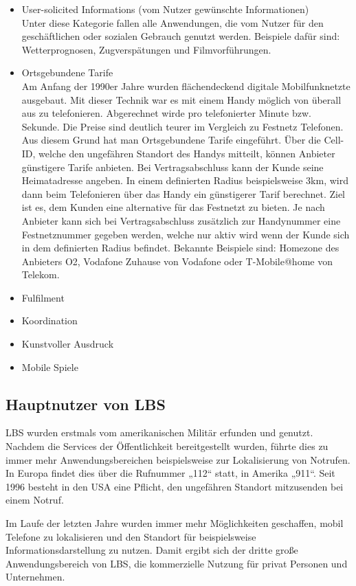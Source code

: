 \begin{itemize}
	\item User-solicited Informations (vom Nutzer gewünschte Informationen)\\
Unter diese Kategorie fallen alle Anwendungen, die vom Nutzer für den geschäftlichen oder sozialen Gebrauch genutzt werden. Beispiele dafür sind: Wetterprognosen, Zugverspätungen und Filmvorführungen.
	\item Ortsgebundene Tarife\\
	Am Anfang der 1990er Jahre wurden flächendeckend digitale Mobilfunknetzte ausgebaut. Mit dieser Technik war es mit einem Handy möglich von überall aus zu telefonieren. Abgerechnet wirde pro telefonierter Minute bzw. Sekunde. Die Preise sind deutlich teurer im Vergleich zu Festnetz Telefonen. Aus diesem Grund hat man Ortsgebundene Tarife eingeführt. Über die Cell-ID, welche den ungefähren Standort des Handys mitteilt, können Anbieter günstigere Tarife anbieten. Bei Vertragsabschluss kann der Kunde seine Heimatadresse angeben. In einem definierten Radius beispielsweise 3km, wird dann beim Telefonieren über das Handy ein günstigerer Tarif berechnet. Ziel ist es, dem Kunden eine alternative für das Festnetzt zu bieten. Je nach Anbieter kann sich bei Vertragsabschluss zusätzlich zur Handynummer eine Festnetznummer gegeben werden, welche nur aktiv wird wenn der Kunde sich in dem definierten Radius befindet. Bekannte Beispiele sind: Homezone des Anbieters O2, Vodafone Zuhause von Vodafone oder T-Mobile@home von Telekom.
	\item Fulfilment
	\item Koordination
	\item Kunstvoller Ausdruck
	\item Mobile Spiele
\end{itemize}


\subsection{Hauptnutzer von LBS}

LBS wurden erstmals vom amerikanischen Militär erfunden und genutzt. Nachdem die Services der Öffentlichkeit bereitgestellt wurden, führte dies zu immer mehr Anwendungsbereichen beispielsweise zur Lokalisierung von Notrufen. In Europa findet dies über die Rufnummer „112“ statt, in Amerika „911“.  Seit 1996 besteht in den USA eine Pflicht, den ungefähren Standort mitzusenden bei einem Notruf. 

Im Laufe der letzten Jahre wurden immer mehr Möglichkeiten geschaffen, mobil Telefone zu lokalisieren und den Standort für beispielsweise Informationsdarstellung zu nutzen. Damit ergibt sich der dritte große Anwendungsbereich von LBS, die kommerzielle Nutzung für privat Personen und Unternehmen.

